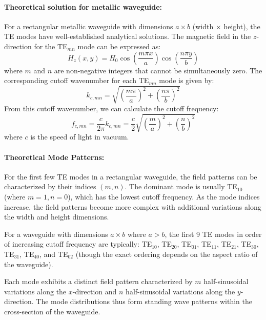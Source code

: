 \documentclass[10pt,letterpaper]{article}
\begin{document}
\paragraph{Theoretical solution for metallic waveguide:}  
For a rectangular metallic waveguide with dimensions $a \times b$ (width $\times$ height), the TE modes have well-established analytical solutions. The magnetic field in the $z$-direction for the TE$_{mn}$ mode can be expressed as:
\begin{equation}
H_z(x,y) = H_0 \cos\left(\frac{m\pi x}{a}\right) \cos\left(\frac{n\pi y}{b}\right)
\end{equation}
where $m$ and $n$ are non-negative integers that cannot be simultaneously zero. The corresponding cutoff wavenumber for each TE$_{mn}$ mode is given by:
\begin{equation}
k_{c,mn} = \sqrt{\left(\frac{m\pi}{a}\right)^2 + \left(\frac{n\pi}{b}\right)^2}
\end{equation}
From this cutoff wavenumber, we can calculate the cutoff frequency:
\begin{equation}
f_{c,mn} = \frac{c}{2\pi}k_{c,mn} = \frac{c}{2}\sqrt{\left(\frac{m}{a}\right)^2 + \left(\frac{n}{b}\right)^2}
\end{equation}
where $c$ is the speed of light in vacuum. 
\paragraph{Theoretical Mode Patterns:}
For the first few TE modes in a rectangular waveguide, the field patterns can be characterized by their indices $(m,n)$. The dominant mode is usually TE$_{10}$ (where $m=1, n=0$), which has the lowest cutoff frequency. As the mode indices increase, the field patterns become more complex with additional variations along the width and height dimensions.

For a waveguide with dimensions $a \times b$ where $a > b$, the first 9 TE modes in order of increasing cutoff frequency are typically: TE$_{10}$, TE$_{20}$, TE$_{01}$, TE$_{11}$, TE$_{21}$, TE$_{30}$, TE$_{31}$, TE$_{40}$, and TE$_{02}$ (though the exact ordering depends on the aspect ratio of the waveguide).

Each mode exhibits a distinct field pattern characterized by $m$ half-sinusoidal variations along the $x$-direction and $n$ half-sinusoidal variations along the $y$-direction. The mode distributions thus form standing wave patterns within the cross-section of the waveguide.
\end{document}
